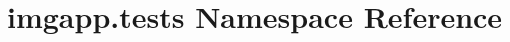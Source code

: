 \hypertarget{namespaceimgapp_1_1tests}{}\section{imgapp.\+tests Namespace Reference}
\label{namespaceimgapp_1_1tests}
